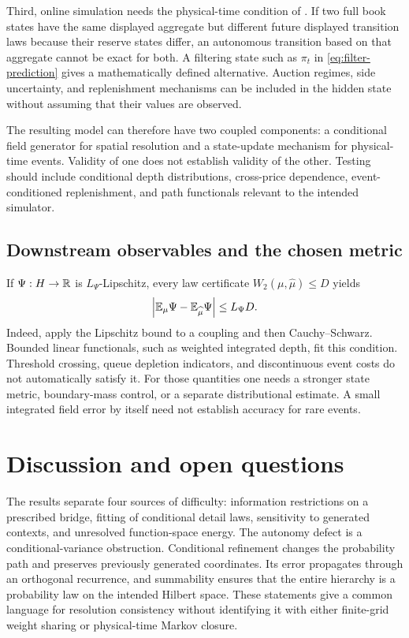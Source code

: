 Third, online simulation needs the physical-time condition of . If two full book states have the same displayed aggregate but different future displayed transition laws because their reserve states differ, an autonomous transition based on that aggregate cannot be exact for both. A filtering state such as $\pi_t$ in \eqref{eq:filter-prediction} gives a mathematically defined alternative. Auction regimes, side uncertainty, and replenishment mechanisms can be included in the hidden state without assuming that their values are observed.

The resulting model can therefore have two coupled components: a conditional field generator for spatial resolution and a state-update mechanism for physical-time events. Validity of one does not establish validity of the other. Testing should include conditional depth distributions, cross-price dependence, event-conditioned replenishment, and path functionals relevant to the intended simulator.

\subsection{Downstream observables and the chosen metric}
If $\Psi:H\to\mathbb R$ is $L_\Psi$-Lipschitz, every law certificate $W_2(\mu,\widehat\mu)\le D$ yields
\begin{equation}\label{eq:observable}
 \left|\mathbb E_\mu\Psi-\mathbb E_{\widehat\mu}\Psi\right|\le L_\Psi D.
\end{equation}
Indeed, apply the Lipschitz bound to a coupling and then Cauchy--Schwarz. Bounded linear functionals, such as weighted integrated depth, fit this condition. Threshold crossing, queue depletion indicators, and discontinuous event costs do not automatically satisfy it. For those quantities one needs a stronger state metric, boundary-mass control, or a separate distributional estimate. A small integrated field error by itself need not establish accuracy for rare events.

\section{Discussion and open questions}
The results separate four sources of difficulty: information restrictions on a prescribed bridge, fitting of conditional detail laws, sensitivity to generated contexts, and unresolved function-space energy. The autonomy defect is a conditional-variance obstruction. Conditional refinement changes the probability path and preserves previously generated coordinates. Its error propagates through an orthogonal recurrence, and summability ensures that the entire hierarchy is a probability law on the intended Hilbert space. These statements give a common language for resolution consistency without identifying it with either finite-grid weight sharing or physical-time Markov closure.

